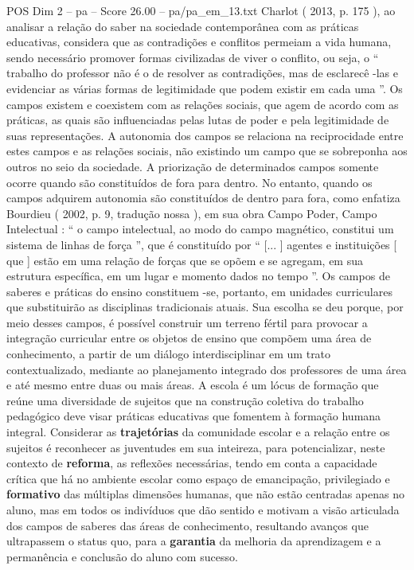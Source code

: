 \begin{textsample}{POS Dim 2 – pa – Score 26.00 – pa/pa\_em\_13.txt}
Charlot ( 2013, p. 175 ), ao analisar a relação do saber na sociedade contemporânea com as práticas educativas, considera que as contradições e conflitos permeiam a vida humana, sendo necessário promover formas civilizadas de viver o conflito, ou seja, o “ trabalho do professor não é o de resolver as contradições, mas de esclarecê -las e evidenciar as várias formas de legitimidade que podem existir em cada uma ”.
Os campos existem e coexistem com as relações sociais, que agem de acordo com as práticas, as quais são influenciadas pelas lutas de poder e pela legitimidade de suas representações.
A autonomia dos campos se relaciona na reciprocidade entre estes campos e as relações sociais, não existindo um campo que se sobreponha aos outros no seio da sociedade.
A priorização de determinados campos somente ocorre quando são constituídos de fora para dentro.
No entanto, quando os campos adquirem autonomia são constituídos de dentro para fora, como enfatiza Bourdieu ( 2002, p. 9, tradução nossa ), em sua obra Campo Poder, Campo Intelectual : “ o campo intelectual, ao modo do campo magnético, constitui um sistema de linhas de força ”, que é constituído por “ [... ] agentes e instituições [ que ] estão em uma relação de forças que se opõem e se agregam, em sua estrutura específica, em um lugar e momento dados no tempo ”.
Os campos de saberes e práticas do ensino constituem -se, portanto, em unidades curriculares que substituirão as disciplinas tradicionais atuais.
Sua escolha se deu porque, por meio desses campos, é possível construir um terreno fértil para provocar a integração curricular entre os objetos de ensino que compõem uma área de conhecimento, a partir de um diálogo interdisciplinar em um trato contextualizado, mediante ao planejamento integrado dos professores de uma área e até mesmo entre duas ou mais áreas.
A escola é um lócus de formação que reúne uma diversidade de sujeitos que na construção coletiva do trabalho pedagógico deve visar práticas educativas que fomentem à formação humana integral.
Considerar as \textbf{trajetórias} da comunidade escolar e a relação entre os sujeitos é reconhecer as juventudes em sua inteireza, para potencializar, neste contexto de \textbf{reforma}, as reflexões necessárias, tendo em conta a capacidade crítica que há no ambiente escolar como espaço de emancipação, privilegiado e \textbf{formativo} das múltiplas dimensões humanas, que não estão centradas apenas no aluno, mas em todos os indivíduos que dão sentido e motivam a visão articulada dos campos de saberes das áreas de conhecimento, resultando avanços que ultrapassem o status quo, para a \textbf{garantia} da melhoria da aprendizagem e a permanência e conclusão do aluno com sucesso.

\end{textsample}
